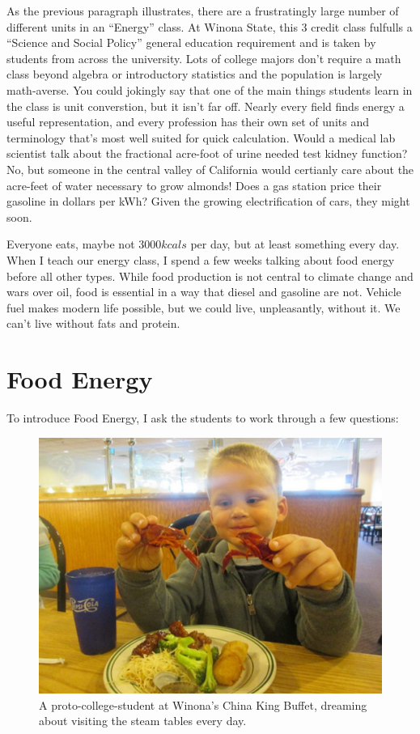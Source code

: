 \documentclass[12pt]{iopart}
\begin{document}
As the previous paragraph illustrates, there are a frustratingly large number of different units in an ``Energy'' class.  At Winona State, this 3 credit class fulfulls a ``Science and Social Policy'' general education requirement and is taken by students from across the university.   Lots of college majors don't require a math class beyond algebra or introductory statistics and the population is largely math-averse. You could jokingly say that one of the main things students learn in the class is unit converstion, but it isn't far off.  Nearly every field finds energy a useful representation, and every profession has their own set of units and terminology that's most well suited for quick calculation.  Would a medical lab scientist talk about the fractional acre-foot of urine needed test kidney function?  No, but someone in the central valley of California would certianly care about the acre-feet of water necessary to grow almonds!  Does a gas station price their gasoline in dollars per kWh? Given the growing electrification of cars, they might soon.

Everyone eats, maybe not $3000 kcals$ per day, but at least something every day.  When I teach our energy class, I spend a few weeks talking about food energy before all other types.  While food production is not central to climate change and wars over oil, food is essential in a way that diesel and gasoline are not.  Vehicle fuel makes modern life possible, but we could live, unpleasantly, without it.  We can't live without fats and protein.  

\section{Food Energy}

To introduce Food Energy, I ask the students to work through a few questions:

\begin{figure}[h]
\centering
\includegraphics[width=\columnwidth]{at_the_buffet.jpg}
\caption{
A proto-college-student at Winona's China King Buffet, dreaming about visiting the steam tables every day. 
}
\label{buffet}
\end{figure}
\end{document}
